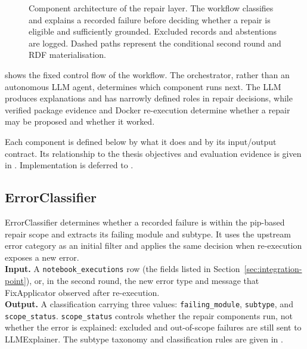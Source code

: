 \begin{figure}[!ht]
%
  \caption{Component architecture of the repair layer. The workflow
           classifies and explains a recorded failure before deciding whether
           a repair is eligible and sufficiently grounded. Excluded records
           and abstentions are logged. Dashed paths represent the conditional
           second round and RDF materialisation.}
  \label{fig:architecture-components}
\end{figure}
\FloatBarrier

\noindent
{} shows the fixed control flow of the
workflow. The orchestrator, rather than an autonomous LLM agent, determines
which component runs next. The LLM produces explanations and has narrowly
defined roles in repair decisions, while verified package evidence and Docker
re-execution determine whether a repair may be proposed and whether it worked.

Each component is defined below by what it does and by its input/output
contract. Its relationship to the thesis objectives and evaluation evidence
is given in . Implementation is deferred to
.

\subsection{ErrorClassifier}
\label{subsec:errorclassifier}
ErrorClassifier determines whether a recorded failure is within the
pip-based repair scope and extracts its failing module and subtype. It uses the
upstream error category as an initial filter and applies the same decision when
re-execution exposes a new error.\\
\textbf{Input.} A \texttt{notebook\_executions} row (the fields listed in
Section~\ref{sec:integration-point}), or, in the second round, the new
error type and message that FixApplicator observed after re-execution.\\
\textbf{Output.} A classification carrying three values:
\texttt{failing\_module}, \texttt{subtype}, and \texttt{scope\_status}.
\texttt{scope\_status} controls whether the repair components run, not
whether the error is explained: excluded and out-of-scope failures are still
sent to LLMExplainer. The subtype taxonomy and classification rules are given
in .


